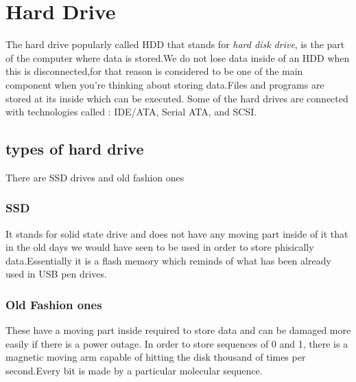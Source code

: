 \documentclass[a4paper,12pt]{article}
\begin{document}


\clearpage

\section{Hard Drive}
The hard drive popularly called HDD that stands for \emph{hard disk drive}, is the part of the computer where data is stored.We do not lose data inside of an HDD when this is disconnected,for that reason is considered to be one of the main component when you're thinking about storing data.Files and programs are stored at its inside which can be executed. Some of the hard drives are connected with technologies called : IDE/ATA, Serial ATA, and SCSI.

\subsection{types of hard drive}
There are SSD drives and old fashion ones

\subsubsection{SSD}
It stands for solid state drive and does not have any moving part inside of it that in the old days we would have seen to be used in order to store phisically data.Essentially it is a flash memory which reminds of what has been already used in USB pen drives.

\subsubsection{Old Fashion ones}
These have a moving part inside required to store data and can be damaged more easily if there is a power outage.
In order to store sequences of 0 and 1, there is a magnetic moving arm capable of hitting the disk thousand of times per second.Every bit is made by a particular molecular sequence.
\clearpage
\end{document}
